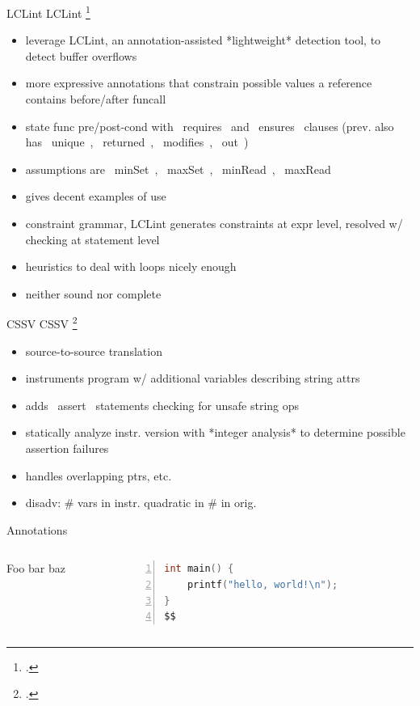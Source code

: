 \documentclass[aspectratio=169]{beamer}
\begin{document}
\begin{frame}[fragile]{LCLint}
LCLint \footcite{larochelle_statically_2001}
\begin{itemize}
    \item leverage LCLint, an annotation-assisted *lightweight* detection tool, to detect buffer overflows
    \item more expressive annotations that constrain possible values a reference contains before/after funcall
    \item state func pre/post-cond with ~requires~ and ~ensures~ clauses (prev. also has ~unique~, ~returned~, ~modifies~, ~out~)
    \item assumptions are ~minSet~, ~maxSet~, ~minRead~, ~maxRead~
    \item gives decent examples of use
    \item constraint grammar, LCLint generates constraints at expr level, resolved w/ checking at statement level
    \item heuristics to deal with loops nicely enough
    \item neither sound nor complete
\end{itemize}
\end{frame}

\begin{frame}[fragile]{CSSV}
CSSV \footcite{dor_cssv:_2003}
\begin{itemize}
    \item source-to-source translation
    \item instruments program w/ additional variables describing string attrs
    \item adds ~assert~ statements checking for unsafe string ops
    \item statically analyze instr. version with *integer analysis* to determine possible assertion failures
    \item handles overlapping ptrs, etc.
    \item  disadv: \# vars in instr. quadratic in \# in orig.
\end{itemize}
\end{frame}


\begin{frame}[fragile]{Annotations}
  \footnotesize
  \begin{columns}[T]
    \begin{column}{0.45\textwidth}
        Foo bar baz
    \end{column}
    \begin{column}{0.45\textwidth}
%      
       \begin{lstlisting}[language=C,numbers=left,mathescape,basicstyle={\footnotesize\ttfamily}]
int main() {
    printf("hello, world!\n");
}
$$
        \end{lstlisting}
    \end{column}
  \end{columns}
\end{frame}
\end{document}
